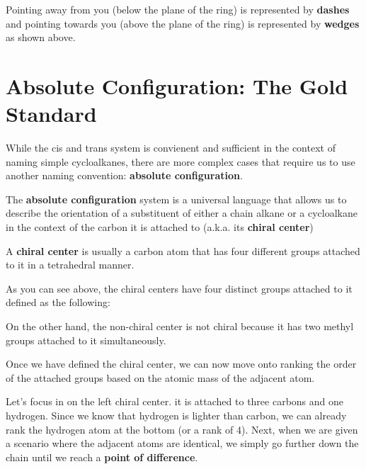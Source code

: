 \documentclass[10pt]{article}
\begin{document}

  Pointing away from you (below the plane of the ring) is represented by \textbf{dashes} and pointing towards you (above the plane of the ring) is represented by \textbf{wedges} as shown above.

\section{Absolute Configuration: The Gold Standard}

  While the cis and trans system is convienent and sufficient in the context of naming simple cycloalkanes, there are more complex cases that require us to use another naming convention: \textbf{absolute configuration}.

  The \textbf{absolute configuration} system is a universal language that allows us to describe the orientation of a substituent of either a chain alkane or a cycloalkane in the context of the carbon it is attached to (a.k.a. its \textbf{chiral center})

  A \textbf{chiral center} is usually a carbon atom that has four different groups attached to it in a tetrahedral manner. 


  As you can see above, the chiral centers have four distinct groups attached to it defined as the following:



  On the other hand, the non-chiral center is not chiral because it has two methyl groups attached to it simultaneously.


  Once we have defined the chiral center, we can now move onto ranking the order of the attached groups based on the atomic mass of the adjacent atom.

  Let's focus in on the left chiral center. it is attached to three carbons and one hydrogen. Since we know that hydrogen is lighter than carbon, we can already rank the hydrogen atom at the bottom (or a rank of 4). Next, when we are given a scenario where the adjacent atoms are identical, we simply go further down the chain until we reach a \textbf{point of difference}. 
\end{document}
